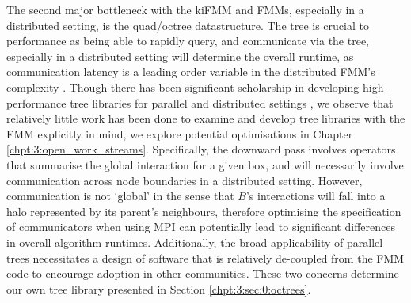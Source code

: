 The second major bottleneck with the kiFMM and FMMs, especially in a distributed setting, is the quad/octree datastructure. The tree is crucial to performance as being able to rapidly query, and communicate via the tree, especially in a distributed setting will determine the overall runtime, as communication latency is a leading order variable in the distributed FMM's complexity \cite{Yokota2014}. Though there has been significant scholarship in developing high-performance tree libraries for parallel and distributed settings \cite{BursteddeWilcoxGhattas11,sundar2008bottom,sundar2013hyksort}, we observe that relatively little work has been done to examine and develop tree libraries with the FMM explicitly in mind, we explore potential optimisations in Chapter \ref{chpt:3:open_work_streams}. Specifically, the downward pass involves operators that summarise the global interaction for a given box, and will necessarily involve communication across node boundaries in a distributed setting. However, communication is not `global' in the sense that $B$'s interactions will fall into a halo represented by its parent's neighbours, therefore optimising the specification of communicators when using MPI can potentially lead to significant differences in overall algorithm runtimes. Additionally, the broad applicability of parallel trees necessitates a design of software that is relatively de-coupled from the FMM code to encourage adoption in other communities. These two concerns determine our own tree library presented in Section \ref{chpt:3:sec:0:octrees}.


